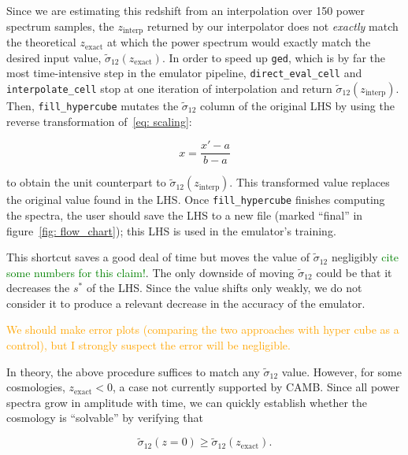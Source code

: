 
Since we are estimating this redshift from an interpolation over 150 power
spectrum samples, the $z_\text{interp}$ returned by our interpolator does not
\textit{exactly} match the theoretical $z_\text{exact}$ at which the
power spectrum would exactly match the desired input value,
$\tilde{\sigma}_{12}(z_\text{exact})$. In order to speed up \texttt{ged},
which is by far the most time-intensive step in the emulator pipeline,
\verb|direct_eval_cell| and \verb|interpolate_cell| stop at one iteration of 
interpolation and return $\tilde{\sigma}_{12}(z_\text{interp})$. Then,
\verb|fill_hypercube| mutates the $\tilde{\sigma}_{12}$ column of the original 
LHS by using the reverse transformation of~\ref{eq: scaling}:

\begin{equation}
x = \frac{x' - a}{b - a}
\end{equation}

to obtain the unit counterpart to $\tilde{\sigma}_{12}(z_\text{interp})$.
This transformed value replaces the original value found in the LHS.
Once \verb|fill_hypercube| finishes computing the spectra, the user
should save the LHS to a new file (marked ``final'' in
figure~\ref{fig: flow_chart}); this LHS is used in the emulator's training.

This shortcut saves a good deal of time but moves the value of
$\tilde{\sigma}_{12}$ negligibly
\textcolor{green}{cite some numbers for this claim!}.
The only downside of moving $\tilde{\sigma}_{12}$ could be that it
decreases the $s^*$ of the LHS. Since the value shifts only weakly, we do not
consider it to produce a relevant decrease in the accuracy of the emulator.

\textcolor{orange}{We should make error plots (comparing the two approaches 
with hyper cube as a control), but I strongly suspect the error will be 
negligible.}

In theory, the above procedure suffices to match any $\tilde{\sigma}_{12}$
value. However, for some cosmologies, $z_\text{exact} < 0$, a case not
currently supported by CAMB. Since all power spectra grow in amplitude with
time, we can quickly establish whether the cosmology is ``solvable'' by
verifying that

\begin{equation}
\label{eq: solvability_cond}
\tilde{\sigma}_{12}(z = 0) \geq \tilde{\sigma}_{12}(z_\text{exact})
.\end{equation}

